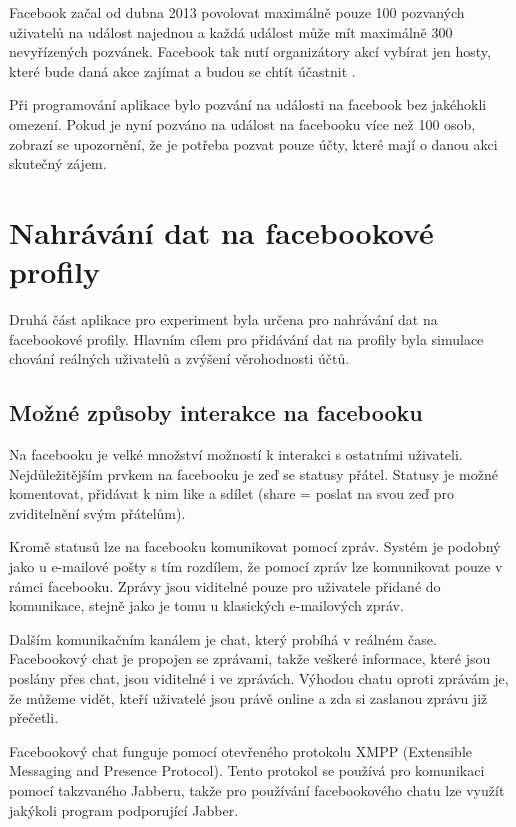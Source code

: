 \documentclass[thesis=M,czech]{FITthesis}[2013/05/10]
\begin{document}
Facebook začal od dubna 2013 povolovat maximálně pouze 100 pozvaných uživatelů na událost najednou a každá událost může mít maximálně 300 nevyřízených pozvánek. Facebook tak nutí organizátory akcí vybírat jen hosty, které bude daná akce zajímat a budou se chtít účastnit \cite{web:fbEventsLimit} \cite{web:fbEventsLimitHelpCenter}.

Při programování aplikace bylo pozvání na události na facebook bez jakéhokli omezení. Pokud je nyní pozváno na událost na facebooku více než 100 osob, zobrazí se upozornění, že je potřeba pozvat pouze účty, které mají o danou akci skutečný zájem.


\section{Nahrávání dat na facebookové profily}

Druhá část aplikace pro experiment byla určena pro nahrávání dat na facebookové profily. Hlavním cílem pro přidávání dat na profily byla simulace chování reálných uživatelů a zvýšení věrohodnosti účtů.

\subsection{Možné způsoby interakce na facebooku}

Na facebooku je velké množství možností k interakci s ostatními uživateli. Nejdůležitějším prvkem na facebooku je zeď se statusy přátel. Statusy je možné komentovat, přidávat k nim like a sdílet (share = poslat na svou zeď pro zviditelnění svým přátelům). 

Kromě statusů lze na facebooku komunikovat pomocí zpráv. Systém je podobný jako u e-mailové pošty s tím rozdílem, že pomocí zpráv lze komunikovat pouze  v rámci facebooku. Zprávy jsou viditelné pouze pro uživatele přidané do komunikace, stejně jako je tomu u klasických e-mailových zpráv. 

Dalším komunikačním kanálem je chat, který probíhá v reálném čase. Facebookový chat je propojen se zprávami, takže veškeré informace, které jsou poslány přes chat, jsou viditelné i ve zprávách. Výhodou chatu oproti zprávám je, že  můžeme vidět, kteří uživatelé jsou právě online a zda si zaslanou zprávu již přečetli. 

Facebookový chat funguje pomocí otevřeného protokolu XMPP (Extensible Messaging and Presence Protocol). Tento protokol se používá pro komunikaci pomocí takzvaného Jabberu, takže pro používání facebookového chatu lze využít jakýkoli program podporující Jabber.
\end{document}
